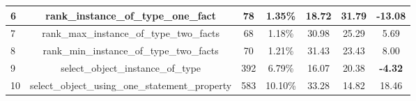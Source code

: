 \begin{table}[h!]
{\begin{tabular}{|l|c|cc|cc|c|}
    6                            & rank\_instance\_of\_type\_one\_fact                                                                                    & 78                                                  & 1.35\%                                                                          & 18.72                                                                                                      & 31.79                                                                                  & \textbf{-13.08}                                                                    \\ \hline
    7                            & rank\_max\_instance\_of\_type\_two\_facts                                                                              & 68                                                  & 1.18\%                                                                          & 30.98                                                                                                      & 25.29                                                                                  & 5.69                                                                               \\ \hline
    8                            & rank\_min\_instance\_of\_type\_two\_facts                                                                              & 70                                                  & 1.21\%                                                                          & 31.43                                                                                                      & 23.43                                                                                  & 8.00                                                                               \\ \hline
    9                            & select\_object\_instance\_of\_type                                                                                     & 392                                                 & 6.79\%                                                                          & 16.07                                                                                                      & 20.38                                                                                  & \textbf{-4.32}                                                                     \\ \hline
    10                           & select\_object\_using\_one\_statement\_property                                                                        & 583                                                 & 10.10\%                                                                         & 33.28                                                                                                      & 14.82                                                                                  & 18.46                                                                              \\ \hline

\end{tabular}}
\end{table}
